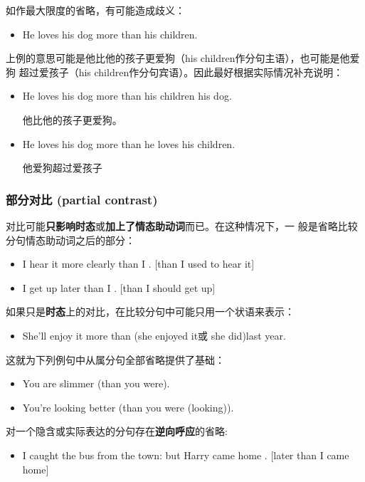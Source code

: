 如作最大限度的省略，有可能造成歧义：
\begin{itemize}
\item He loves his dog more than his children.
\end{itemize}
上例的意思可能是他比他的孩子更爱狗（his children作分句主语），也可能是他爱狗
超过爱孩子（his children作分句宾语）。因此最好根据实际情况补充说明：
\begin{itemize}
\item He loves his dog more than his children  his dog.

  他比他的孩子更爱狗。
\item He loves his dog more than he loves his children.

  他爱狗超过爱孩子
\end{itemize}


\subsubsection{部分对比 (partial contrast)}

对比可能\textbf{只影响时态}或\textbf{加上了情态助动词}而已。在这种情况下，一
般是省略比较分句情态助动词之后的部分：

\begin{itemize}
\item I hear it more clearly than I . [than I used to hear it]

\item I get up later than I . [than I should get up]
\end{itemize}

如果只是\textbf{时态}上的对比，在比较分句中可能只用一个状语来表示：
\begin{itemize}
\item She'll enjoy it more than (she enjoyed it或 she did)last year.
\end{itemize}
这就为下列例句中从属分句全部省略提供了基础：
\begin{itemize}
\item You are slimmer (than you were).
\item You're looking better (than you were (looking)).
\end{itemize}

对一个隐含或实际表达的分句存在\textbf{逆向呼应}的省略:
\begin{itemize}
\item I caught the bus from the town: but Harry came home . [later than I came home]
\end{itemize}


